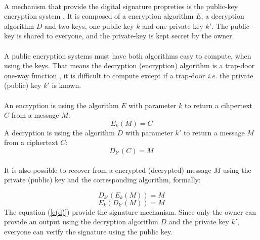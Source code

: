\documentclass[letterpaper]{article}
\begin{document}
\paragraph{}
A mechanism that provide the digital signature propreties is the public-key
encryption system \cite{RSA}. It is composed of a encryption algorithm $E$, a
decryption algorithm $D$ and two keys, one public key $k$ and one private key
$k'$. The public-key is shared to everyone, and the private-key is
kept secret by the owner.

\paragraph{}
A public encryption systems must have both algorithms
easy to compute, when using the keys. That means the decryption (encryption)
algorithm is a trap-door one-way function \cite{DiffieHellman}, it
is difficult to compute except if a trap-door \textit{i.e.}
the private (public) key $k'$ is known.
\paragraph{}

An encryption is using the algorithm $E$ with parameter $k$
to return a cihpertext $C$ from a message $M$:
\begin{equation}
    E_k(M) = C
\end{equation}
A decryption is using the algorithm $D$ with parameter $k'$
to return a message $M$ from a ciphertext $C$:
\begin{equation}
    D_{k'}(C) = M
\end{equation}

\paragraph{}
It is also possible to recover from a encrypted
(decrypted) message $M$ using the private (public) key and the
corresponding algorithm, formally:

\begin{equation}
    D_{k'}(E_k(M)) = M
\end{equation}
\begin{equation}
    \label{e(d)}
    E_{k}(D_{k'}(M)) = M
\end{equation}
The equation (\ref{e(d)}) provide the signature mechanism. Since only
the owner can provide an output using the decryption algorithm $D$ and
the private key $k'$, everyone can verify the signature using the public key.
\end{document}
